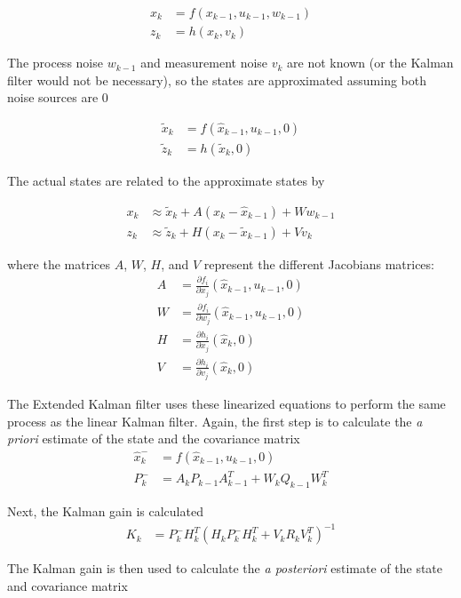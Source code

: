 \begin{align}
x_k &= f(x_{k-1},u_{k-1},w_{k-1})\\
z_k &= h(x_k,v_k)
\end{align}

The process noise $w_{k-1}$ and measurement noise $v_k$ are not known (or the Kalman filter would not be necessary), so the states are approximated assuming both noise sources are 0

\begin{align}
\tilde{x}_k &= f(\hat{x}_{k-1},u_{k-1},0)\\
\tilde{z}_k &= h(\tilde{x}_k,0)
\end{align}

The actual states are related to the approximate states by

\begin{align}
x_k &\approx\tilde{x}_k+A(x_k-\hat{x}_{k-1})+Ww_{k-1}\\
z_k &\approx\tilde{z}_k+H(x_k-\tilde{x}_{k-1})+Vv_k
\end{align}

where  the matrices $A$, $W$, $H$, and $V$ represent the different Jacobians matrices:
\begin{align}
A &= \frac{\partial f_i}{\partial x_j}(\hat{x}_{k-1},u_{k-1},0)\\
W &= \frac{\partial f_i}{\partial w_j}(\hat{x}_{k-1},u_{k-1},0)\\
H &= \frac{\partial h_i}{\partial x_j}(\hat{x}_{k},0)\\
V &= \frac{\partial h_i}{\partial v_j}(\hat{x}_{k},0)
\end{align}

The Extended Kalman filter uses these linearized equations to perform the same process as the linear Kalman filter. Again, the first step is to calculate the \textit{a priori} estimate of the state and the covariance matrix
\begin{align}
\hat{x}^-_k &=f(\hat{x}_{k-1},u_{k-1},0)\\
P^-_k  &= A_kP_{k-1}A^T_{k-1}+W_kQ_{k-1}W^T_k
\end{align}

Next, the Kalman gain is calculated
\begin{align}
K_k &=P^-_kH^T_k(H_kP^-_kH^T_k+V_kR_kV^T_k)^{-1}
\end{align}

The Kalman gain is then used to calculate the \textit{a posteriori} estimate of the state and covariance matrix

